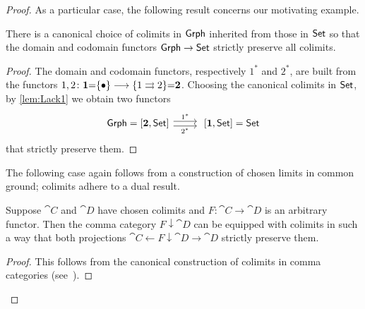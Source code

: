 \documentclass{amsart}
\begin{document}
\begin{proof}
As a particular case, the following result concerns our motivating example.
\begin{cor}
There is a canonical choice of colimits in $\mathsf{Grph}$ inherited from those in $\mathsf{Set}$ so that the domain and codomain functors $\mathsf{Grph}\to\mathsf{Set}$ strictly preserve all colimits.
\end{cor}

\begin{proof}
  The domain and codomain functors, respectively $1^\ast$ and
  $2^\ast$, are built from the functors
  $1,2\colon\mathbf{1}{=}\{\bullet\}\longrightarrow\{1\rightrightarrows2\}{=}\mathbf{2}$.  Choosing the canonical colimits in $\mathsf{Set}$, by \cref{lem:Lack1} we obtain two functors
\begin{displaymath}
\begin{tikzcd}
 \Grph=[\two,\Set]\ar[r,shift left,"1^\ast"]\ar[r,shift right,"2^\ast"'] & \;[\one,\Set]=\Set
 \end{tikzcd}
\end{displaymath}
that strictly preserve them.
\end{proof}

The following case again follows from a construction of chosen limits in common ground; colimits adhere to a dual result.
\begin{lem}
Suppose $\cat{C}$ and $\cat{D}$ have chosen colimits and $F\colon\cat{C}\to\cat{D}$ is an arbitrary functor. Then the comma category $F\downarrow\cat{D}$ can be equipped with colimits in such a way that both projections $\cat{C}\leftarrow F\downarrow\cat{D}\to\cat{D}$ strictly preserve them.
\end{lem}

\begin{proof}
 This follows from the canonical construction of colimits in comma categories (see~\cite[\S 2.16]{Handbook1}).
\end{proof}


\end{proof}
\end{document}
